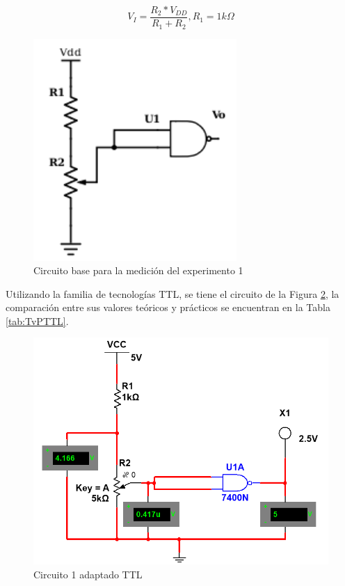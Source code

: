 \documentclass[journal]{IEEEtran}
\begin{document}
	\begin{equation}
		V_{I} = \frac{R_{2}*V_{DD}}{R_{1} + R_{2}}, R_{1} = 1k\Omega
		\label{eqn:CRE1}
	\end{equation}
	
	\begin{figure}[htb]
		\centering
		\includegraphics[scale = 0.3]{img/Circuito1.png}
		\caption{Circuito base para la medición del experimento 1}
		\label{fig:Circuito1}
	\end{figure}
	
	Utilizando la familia de tecnologías TTL, se tiene el circuito de la Figura \ref{fig:TTLC1}, la comparación entre sus valores teóricos y prácticos se encuentran en la Tabla \ref{tab:TvPTTL}.
	
	\begin{figure}[htb]
		\centering
		\includegraphics[scale = 0.4]{img/TTLC1.png}
		\caption{Circuito 1 adaptado TTL}
		\label{fig:TTLC1}
	\end{figure}
	
\end{document}
